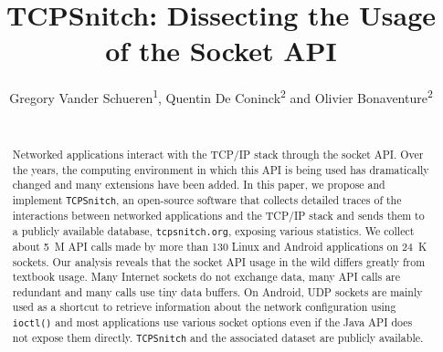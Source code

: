 \documentclass{sig-alternate-10pt}
\begin{document}
\title{TCPSnitch: Dissecting the Usage of the Socket API}


\newcommand{\tcpsnitch}{\texttt{TCPSnitch} }
\newcommand{\tcpsnitchns}{\texttt{TCPSnitch}}
\newcommand{\tcpsnitchwebns}{\texttt{tcpsnitch.org}}

\author{
\alignauthor Gregory Vander Schueren\textsuperscript{1}, Quentin De Coninck\textsuperscript{2} and Olivier Bonaventure\textsuperscript{2} \\
    \\
}
\maketitle

\begin{abstract}
Networked applications interact with the TCP/IP stack through the socket API.
Over the years, the computing environment in which this API is being used has
dramatically changed and many extensions have been added. In this paper, we
propose and implement \tcpsnitchns, an open-source software that collects
detailed traces of the interactions between networked applications and the
TCP/IP stack and sends them to a publicly
available database, \tcpsnitchwebns, exposing various statistics. We collect
about 5~M API calls made by more than 130 Linux and Android applications on
24~K sockets. Our analysis reveals that the socket API usage in the wild
differs greatly from textbook usage. Many Internet sockets do not exchange
data, many API calls are redundant and many calls use tiny data buffers. On
Android, UDP sockets are mainly used as a shortcut to retrieve information
about the network configuration using \texttt{ioctl()} and most applications
use various socket options even if the Java API does not expose them directly.
\tcpsnitch and the associated dataset are publicly available.
\end{abstract}







\newpage


\end{document}
